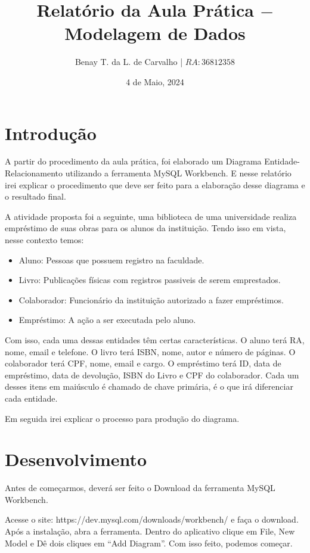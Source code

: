 \documentclass{report}
\title{Relatório da Aula Prática $-$ Modelagem de Dados}
\author{Benay T. da L. de Carvalho | $RA: 36812358$}
\date{4 de Maio, 2024}
\begin{document}
\maketitle

\thispagestyle{headings}
\indent
\section{Introdução}
A partir do procedimento da aula prática, foi elaborado um Diagrama
Entidade-Relacionamento utilizando a ferramenta MySQL Workbench. 
E nesse relatório irei explicar o procedimento que deve ser feito para a 
elaboração desse diagrama e o resultado final.

A atividade proposta foi a seguinte, uma biblioteca de uma universidade
realiza empréstimo de suas obras para os alunos da instituição. Tendo isso
em vista, nesse contexto temos:
\begin{itemize}
    \item Aluno: Pessoas que possuem registro na faculdade.
    \item Livro: Publicações físicas com registros passiveis de serem emprestados.
    \item Colaborador: Funcionário da instituição autorizado a fazer empréstimos.
    \item Empréstimo: A ação a ser executada pelo aluno.
\end{itemize}

Com isso, cada uma dessas entidades têm certas características. O aluno terá
RA, nome, email e telefone. O livro terá ISBN, nome, autor e número de páginas.
O colaborador terá CPF, nome, email e cargo. O empréstimo terá ID, data de empréstimo,
data de devolução, ISBN do Livro e CPF do colaborador. Cada um desses itens em maiúsculo
é chamado de chave primária, é o que irá diferenciar cada entidade.

Em seguida irei explicar o processo para produção do diagrama.

\indent
\section{Desenvolvimento}
Antes de começarmos, deverá ser feito o Download da ferramenta MySQL Workbench.

Acesse o site: https://dev.mysql.com/downloads/workbench/ e faça o download.
Após a instalação, abra a ferramenta. Dentro do aplicativo clique em File,
New Model e Dê dois cliques em ``Add Diagram''. Com isso feito, podemos começar.
\end{document}
